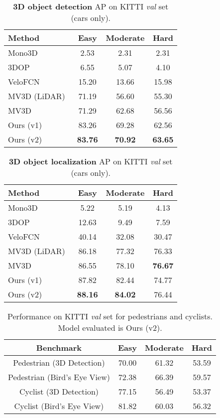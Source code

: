 \documentclass[10pt,twocolumn,letterpaper]{article}
\begin{document}
\begin{table}[t!]
\small
\centering
\label{tab:kitti_valid}
\begin{tabular}{l||ccc}
\hline
Method & Easy    & Moderate    & Hard   \\ \hline
Mono3D~\cite{chen2016monocular} & 2.53 & 2.31 & 2.31 \\ 3DOP~\cite{chen20153d}  & 6.55 & 5.07 & 4.10 \\ \hline
VeloFCN~\cite{li20163d} & 15.20 & 13.66 & 15.98 \\ MV3D (LiDAR)~\cite{cvpr17chen} & 71.19 & 56.60 & 55.30 \\ MV3D~\cite{cvpr17chen} & 71.29 & 62.68 & 56.56 \\ \hline
Ours (v1) & 83.26 & 69.28 & 62.56 \\
Ours (v2) & \textbf{83.76} & \textbf{70.92} & \textbf{63.65}\\ \hline
\end{tabular}
\caption{\textbf{3D object detection} AP on KITTI \emph{val} set (cars only).}
\label{tab:kitti_val_3d_detection}
\end{table}


\begin{table}[t!]
\small
\centering
\label{tab:kitti_valid}
\begin{tabular}{l||ccc}
\hline
Method & Easy    & Moderate   & Hard   \\ \hline
Mono3D~\cite{chen2016monocular} & 5.22 & 5.19 & 4.13 \\ 3DOP~\cite{chen20153d}  & 12.63 & 9.49 & 7.59 \\ \hline
VeloFCN~\cite{li20163d} &  40.14 & 32.08 & 30.47 \\ MV3D (LiDAR)~\cite{cvpr17chen} & 86.18 & 77.32 & 76.33 \\ MV3D~\cite{cvpr17chen} & 86.55 & 78.10 & \textbf{76.67} \\ \hline
Ours (v1) & 87.82 & 82.44 & 74.77 \\
Ours (v2) & \textbf{88.16} & \textbf{84.02} & 76.44 \\ \hline
\end{tabular}
\caption{\textbf{3D object localization} AP on KITTI \emph{val} set (cars only).}
\label{tab:kitti_val_3d_localization}
\end{table}

\begin{table}[h!]
\small
\centering
\begin{tabular}{|c|c|c|c|}
    \hline
    Benchmark & Easy & Moderate & Hard \\ \hline
    Pedestrian (3D Detection) & 70.00 & 61.32 & 53.59 \\ \hline
    Pedestrian (Bird's Eye View) & 72.38 & 66.39 & 59.57 \\ \hline
    Cyclist (3D Detection) & 77.15 & 56.49 & 53.37 \\ \hline
    Cyclist (Bird's Eye View) & 81.82 & 60.03 & 56.32 \\ \hline
\end{tabular}
\caption{Performance on KITTI \emph{val} set for pedestrians and cyclists. Model evaluated is Ours (v2).}
\label{tab:val_ped_cyc}
\end{table}
\end{document}
